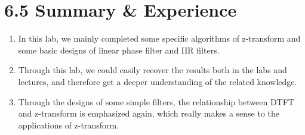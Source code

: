 \documentclass[onecolumn,oneside]{SUSTechHomework}
\begin{document}
\section*{6.5 Summary \& Experience}
\begin{enumerate}
    \item In this lab, we mainly completed some specific algorithms of z-transform and some basic designs of linear phase filter and
    IIR filters.
    \item Through this lab, we could easily recover the results both in the labs and lectures, and therefore get a deeper understanding
    of the related knowledge.
    \item Through the designs of some simple filters, the relationship between DTFT and z-transform is emphasized again, which really makes a sense
    to the applications of z-transform. 
\end{enumerate}
\end{document}
